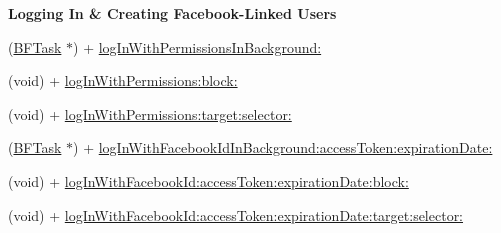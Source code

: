 \begin{Indent}{\bf Logging In \& Creating Facebook-\/\+Linked Users}\par
{\em 

 

 }\begin{DoxyCompactItemize}
\item 
(\hyperlink{interface_b_f_task}{B\+F\+Task} $\ast$) + \hyperlink{interface_p_f_facebook_utils_a36d9551e9b6620474af1d8243992baf2}{log\+In\+With\+Permissions\+In\+Background\+:}
\item 
(void) + \hyperlink{interface_p_f_facebook_utils_a64ca6f3a519a43674f010fa8cc1d221f}{log\+In\+With\+Permissions\+:block\+:}
\item 
(void) + \hyperlink{interface_p_f_facebook_utils_aff49d29f8d097ecce534e97ae699e68e}{log\+In\+With\+Permissions\+:target\+:selector\+:}
\item 
(\hyperlink{interface_b_f_task}{B\+F\+Task} $\ast$) + \hyperlink{interface_p_f_facebook_utils_a61b86570e9e314e40a9ebf4c478944de}{log\+In\+With\+Facebook\+Id\+In\+Background\+:access\+Token\+:expiration\+Date\+:}
\item 
(void) + \hyperlink{interface_p_f_facebook_utils_a0100772e8a70f54ac869c3dc8a776f57}{log\+In\+With\+Facebook\+Id\+:access\+Token\+:expiration\+Date\+:block\+:}
\item 
(void) + \hyperlink{interface_p_f_facebook_utils_a13b2485753a4352daab1d99f2a34e0ae}{log\+In\+With\+Facebook\+Id\+:access\+Token\+:expiration\+Date\+:target\+:selector\+:}
\end{DoxyCompactItemize}
\end{Indent}
